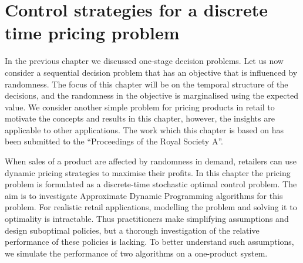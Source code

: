 \documentclass[main.tex]{subfiles}
\begin{document}
\chapter{Control strategies for a discrete time pricing
  problem}\label{ch:discrete_control}

In the previous chapter we discussed one-stage decision problems.
Let us now consider a sequential decision problem that has an
objective that is influenced by randomness. The focus of this chapter
will be on the temporal structure of the
decisions, and the randomness in the objective is marginalised using
the expected value.
We consider another simple problem for pricing
products in retail to motivate the concepts and results in this
chapter, however, the insights are applicable to other applications.
The work which this chapter is based on has been submitted to
the ``Proceedings of the Royal Society A''.

When sales of a product are affected by randomness in demand,
retailers can use dynamic pricing strategies to maximise their
profits. In this chapter the pricing problem is formulated as a
discrete-time stochastic optimal control problem. The aim is to
investigate Approximate Dynamic Programming algorithms
\citep{powell2011approximate} for this
problem. For realistic retail applications, modelling the problem
and solving it to optimality is intractable. Thus practitioners make
simplifying assumptions and design suboptimal policies, but a thorough
investigation of the relative performance of these policies is
lacking. To better understand such assumptions, we simulate the
performance of two algorithms on a one-product system.

\end{document}
